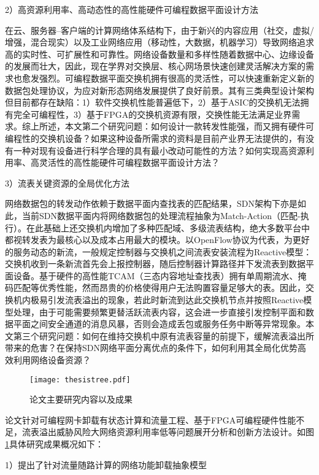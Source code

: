 2）高资源利用率、高动态性的高性能硬件可编程数据平面设计方法

在云、服务器--客户端的计算网络体系结构下，由于新兴的内容应用（社交，虚拟/增强，混合现实）以及工业网络应用（移动性，大数据，机器学习）导致网络追求高的实时性、可扩展性和可靠性。网络设备数量和多样性随着数据中心、边缘设备的发展而壮大，因此，现在学界对交换层、核心网场景快速创建灵活解决方案的需求也愈发强烈。可编程数据平面交换机拥有很高的灵活性，可以快速重新定义新的数据包处理协议，为应对新形态网络发展提供了良好前景。其有三类典型设计架构但目前都存在缺陷：1）软件交换机性能普遍低下，2）基于ASIC的交换机无法拥有完全可编程性，3）基于FPGA的交换机资源有限，交换性能无法满足业界需求。综上所述，本文第二个研究问题：如何设计一款转发性能强，而又拥有硬件可编程性的交换机设备？如果这种设备所需求的资料是目前产业界无法提供的，有没有一种对现有设备进行科学合理的具有最小改动可能性的方法？如何实现高资源利用率、高灵活性的高性能硬件可编程数据平面设计方法？

3）流表关键资源的全局优化方法

网络数据包的转发动作依赖于数据平面内查找表的匹配结果，SDN架构下亦是如此，当前SDN数据平面内将网络数据包的处理流程抽象为Match-Action（匹配-执行）。在此基础上还交换机内增加了多种匹配域、多级流表结构，绝大多数平台中都视转发表为最核心以及成本占用最大的模块。以OpenFlow协议为代表，为更好的服务动态的新流，一般规定控制器与交换机之间流表安装流程为Reactive模型：交换机收到一条新流首先会上报控制器，随后控制器计算路径并下发流表到数据平面设备。基于硬件的高性能TCAM（三态内容地址查找表）拥有单周期流水、掩码匹配等优秀性能，然而昂贵的价格使得用户无法购置容量足够大的表。因此，交换机内极易引发流表溢出的现象，若此时新流到达此交换机节点并按照Reactive模型处理，由于可能需要频繁更替活跃流表内容，这会进一步直接引发控制平面和数据平面之间安全通道的消息风暴，否则会造成丢包或服务任务中断等异常现象。本文第三个研究问题：如何在维持交换机中原有流表容量的前提下，缓解流表溢出所带来的危害？在保持SDN网络平面分离优点的条件下，如何利用其全局化优势高效利用网络设备资源？


\begin{figure}[!ht]
	\centering
	\texttt{[image: thesistree.pdf]}
	\caption{论文主要研究内容以及成果} \label{thesistree}
\end{figure}

论文针对可编程网卡卸载有状态计算和流量工程、基于FPGA可编程硬件性能不足，流表溢出威胁风险大网络资源利用率低等问题展开分析和创新方法设计。如图\ref{thesistree}具体研究成果概况如下：

1）提出了针对流量随路计算的网络功能卸载抽象模型

